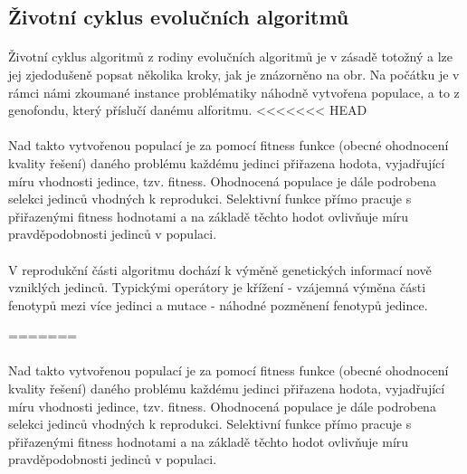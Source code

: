 \documentclass[bc,male,java,dept460]{diploma}		%
\begin{document}
\subsection{Životní cyklus evolučních algoritmů}


\paragraph*{}
Životní cyklus algoritmů z rodiny evolučních algoritmů je v zásadě totožný a lze jej zjedodušeně popsat několika kroky, jak je znázorněno na obr. Na počátku je v rámci námi zkoumané instance problématiky náhodně vytvořena populace, a to z genofondu, který příslučí danému alforitmu.
<<<<<<< HEAD

\paragraph*{}
Nad takto vytvořenou populací je za pomocí fitness funkce (obecné ohodnocení kvality řešení) daného problému každému jedinci přiřazena hodota, vyjadřující míru vhodnosti jedince, tzv. fitness. Ohodnocená populace je dále podrobena selekci jedinců vhodných k reprodukci. Selektivní funkce přímo pracuje s přiřazenými fitness hodnotami a na základě těchto hodot ovlivňuje míru pravděpodobnosti jedinců v populaci.

\paragraph*{}
V reprodukční části algoritmu dochází k výměně genetických informací nově vzniklých jedinců. Typickými operátory je křížení - vzájemná výměna části fenotypů mezi více jedinci a mutace - náhodné pozměnení fenotypů jedince.

=======

\paragraph*{}
Nad takto vytvořenou populací je za pomocí fitness funkce (obecné ohodnocení kvality řešení) daného problému každému jedinci přiřazena hodota, vyjadřující míru vhodnosti jedince, tzv. fitness. Ohodnocená populace je dále podrobena selekci jedinců vhodných k reprodukci. Selektivní funkce přímo pracuje s přiřazenými fitness hodnotami a na základě těchto hodot ovlivňuje míru pravděpodobnosti jedinců v populaci.
\end{document}
